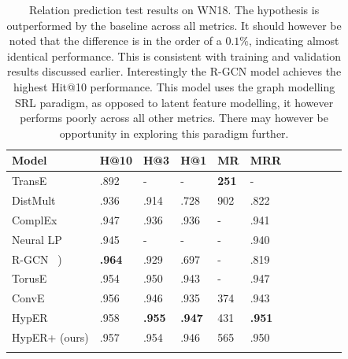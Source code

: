 
\begin{table}[H]
		\centering
		\begin{tabular}{lllllllllll}
  			\textbf{Model} & \textbf{H@10} & \textbf{H@3} & \textbf{H@1} & \textbf{MR} & \textbf{MRR} \\
  			\hline
  			TransE \unskip~\citep{bordes2013translating} & .892 & - & - & \textbf{251} & - \\
  			DistMult \unskip~\citep{yang2014embedding} & .936 & .914 & .728 & 902 & .822 \\
  			ComplEx \unskip~\citep{trouillon2016complex} & .947 & .936 & .936 & - & .941 \\
  			Neural LP \unskip~\citep{yang2017differentiable} & .945 & - & - & - & .940 \\
			R-GCN \unskip~\citep{schlichtkrull2018modeling}) & \textbf{.964} & .929 & .697 & - & .819 \\
			TorusE \unskip~\citep{ebisu2018toruse} & .954 & .950 & .943 & - & .947 \\
			ConvE \unskip~\citep{dettmers2018convolutional} & .956 & .946 & .935 & 374 & .943 \\
			HypER \unskip~\citep{balazevic2019hypernetwork} & .958 & \textbf{.955} & \textbf{.947} & 431 & \textbf{.951} \\
  			\hline
  			HypER+ (ours) & .957 & .954 & .946 & 565 & .950 \\
			&
		\end{tabular}
		\captionsetup{justification=centering}
		\caption{Relation prediction test results on WN18. The hypothesis is outperformed by the baseline across all metrics. It should however be noted that the difference is in the order of a $ 0.1\% $, indicating almost identical performance. This is consistent with training and validation results discussed earlier. Interestingly the R-GCN model achieves the highest Hit@10 performance. This model uses the graph modelling SRL paradigm, as opposed to latent feature modelling, it however performs poorly across all other metrics. There may however be opportunity in exploring this paradigm further. }
\end{table}

